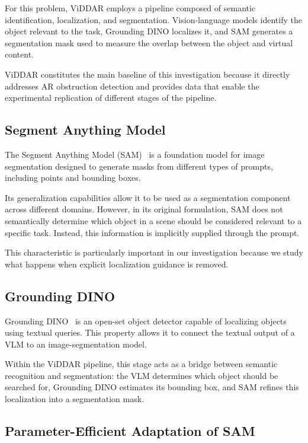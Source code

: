 \documentclass[conference]{IEEEtran}
\begin{document}
For this problem, ViDDAR employs a pipeline composed of semantic identification, localization, and segmentation. Vision-language models identify the object relevant to the task, Grounding DINO localizes it, and SAM generates a segmentation mask used to measure the overlap between the object and virtual content.

ViDDAR constitutes the main baseline of this investigation because it directly addresses AR obstruction detection and provides data that enable the experimental replication of different stages of the pipeline.

\subsection{Segment Anything Model}

The Segment Anything Model (SAM)~\cite{sam} is a foundation model for image segmentation designed to generate masks from different types of prompts, including points and bounding boxes.

Its generalization capabilities allow it to be used as a segmentation component across different domains. However, in its original formulation, SAM does not semantically determine which object in a scene should be considered relevant to a specific task. Instead, this information is implicitly supplied through the prompt.

This characteristic is particularly important in our investigation because we study what happens when explicit localization guidance is removed.

\subsection{Grounding DINO}

Grounding DINO~\cite{groundingdino} is an open-set object detector capable of localizing objects using textual queries. This property allows it to connect the textual output of a VLM to an image-segmentation model.

Within the ViDDAR pipeline, this stage acts as a bridge between semantic recognition and segmentation: the VLM determines which object should be searched for, Grounding DINO estimates its bounding box, and SAM refines this localization into a segmentation mask.

\subsection{Parameter-Efficient Adaptation of SAM}
\end{document}
